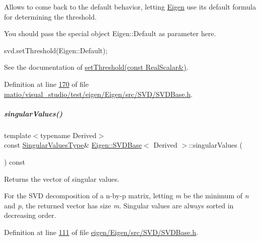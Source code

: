 Allows to come back to the default behavior, letting \hyperlink{namespace_eigen}{Eigen} use its default formula for determining the threshold.

You should pass the special object Eigen\+::\+Default as parameter here. 
\begin{DoxyCode}
svd.setThreshold(Eigen::Default); 
\end{DoxyCode}


See the documentation of \hyperlink{group___s_v_d___module_a1c95d05398fc15e410a28560ef70a5a6}{set\+Threshold(const Real\+Scalar\&)}. 

Definition at line \hyperlink{matio_2visual__studio_2test_2eigen_2_eigen_2src_2_s_v_d_2_s_v_d_base_8h_source_l00170}{170} of file \hyperlink{matio_2visual__studio_2test_2eigen_2_eigen_2src_2_s_v_d_2_s_v_d_base_8h_source}{matio/visual\+\_\+studio/test/eigen/\+Eigen/src/\+S\+V\+D/\+S\+V\+D\+Base.\+h}.

\mbox{\label{group___s_v_d___module_a4e7bac123570c348f7ed6be909e1e474}} 
\subparagraph{\texorpdfstring{singular\+Values()}{singularValues()}\hspace{0.1cm}{\footnotesize\ttfamily [1/2]}}
{\footnotesize\ttfamily template$<$typename Derived$>$ \\
const \hyperlink{class_eigen_1_1internal_1_1_tensor_lazy_evaluator_writable}{Singular\+Values\+Type}\& \hyperlink{group___s_v_d___module_class_eigen_1_1_s_v_d_base}{Eigen\+::\+S\+V\+D\+Base}$<$ Derived $>$\+::singular\+Values (\begin{DoxyParamCaption}{ }\end{DoxyParamCaption}) const\hspace{0.3cm}{\ttfamily [inline]}}

\begin{DoxyReturn}{Returns}
the vector of singular values.
\end{DoxyReturn}
For the S\+VD decomposition of a n-\/by-\/p matrix, letting {\itshape m} be the minimum of {\itshape n} and {\itshape p}, the returned vector has size {\itshape m}. Singular values are always sorted in decreasing order. 

Definition at line \hyperlink{eigen_2_eigen_2src_2_s_v_d_2_s_v_d_base_8h_source_l00111}{111} of file \hyperlink{eigen_2_eigen_2src_2_s_v_d_2_s_v_d_base_8h_source}{eigen/\+Eigen/src/\+S\+V\+D/\+S\+V\+D\+Base.\+h}.

